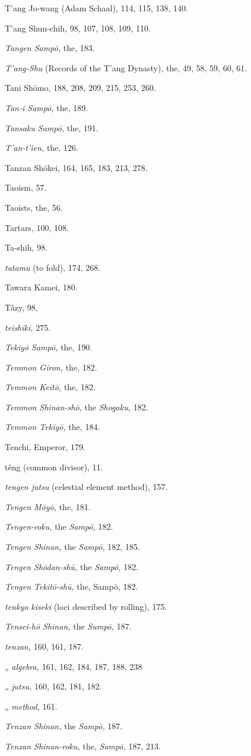 \documentclass[11pt]{article}
\begin{document}
T'ang Jo-wang (Adam Schaal), 114, 115, 138, 140.\par
T'ang Shun-chih, 98, 107, 108, 109, 110.\par
\emph{Tangen Sampō,} the, 183.\par
\emph{T'ang-Shu} (Records of the T'ang Dynasty), the, 49, 58, 59, 60, 61.\par
Tani Shōmo, 188, 208, 209, 215, 253, 260.\par
\emph{Tan-i Sampō,} the, 189.\par
\emph{Tansaku Sampō,} the, 191.\par
\emph{T'an-t'ien,} the, 126.\par
Tanzan Shōkei, 164, 165, 183, 213, 278.\par
Taoism, 57.\par
Taoists, the, 56.\par
Tartars, 100, 108.\par
Ta-shih, 98.\par
\emph{tatamu} (to fold), 174, 268.\par
Tawara Kamei, 180.\par
Tâzy, 98,\par
\emph{teishiki,} 275.\par
\emph{Tekiyō Sampō,} the, 190.\par
\emph{Temmon Giron,} the, 182.\par
\emph{Temmon Keitō,} the, 182.\par
\emph{Temmon Shinan-shō,} the \emph{Shogaku,} 182.\par
\emph{Temmon Tekiyō,} the, 184.\par
Tenchi, Emperor, 179.\par
têng (common divisor), 11.\par
\emph{tengen jutsu} (celestial element method), 157.\par
\emph{Tengen Mōyō,} the, 181.\par
\emph{Tengen-roku,} the \emph{Sampō,} 182.\par
\emph{Tengen Shinan,} the \emph{Sampō,} 182, 185.\par
\emph{Tengen Shōdan-shū,} the \emph{Sampō,} 182.\par
\emph{Tengen Tekitō-shū,} the, Sampō, 182.\par
\emph{tenkyo kiseki} (loci described by rolling), 175.\par
\emph{Tensei-hō Shinan,} the \emph{Sumpō,} 187.\par
\emph{tenzan,} 160, 161, 187.\par
\quad „ \emph{algebra,} 161, 162, 184, 187, 188, 238\par
\quad „ \emph{jutsu,} 160, 162, 181, 182.\par
\quad „ \emph{method,} 161.\par
\emph{Tenzan Shinan,} the \emph{Sampō,} 187.\par
\emph{Tenzan Shinan-roku,} the, \emph{Sampō,} 187, 213.\par
\end{document}
